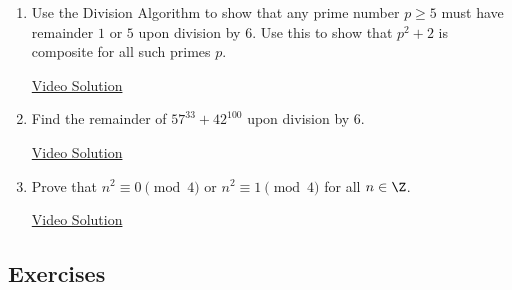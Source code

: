 \begin{enumerate}\renewcommand{\labelenumi}{\thesubsection.\theenumi}
    \item Use the Division Algorithm to show that any prime number $p \geq 5$ must have remainder $1$ or $5$ upon division by $6$. Use this to show that $p^2 + 2$ is composite for all such primes $p$.
    
    \href{https://youtu.be/5kSRSP5FHKw}{Video Solution}
    
    \item Find the remainder of $57^{33} + 42^{100}$ upon division by $6$.
    
    \href{https://youtu.be/BQHAWJmsEAU}{Video Solution}
    
    \item Prove that $n^2 \equiv 0 \pmod 4$ or $n^2 \equiv 1 \pmod 4$ for all $n \in \Z$.
    
    \href{https://youtu.be/st9pXz2agyw}{Video Solution}
\end{enumerate}

\subsection*{Exercises}

